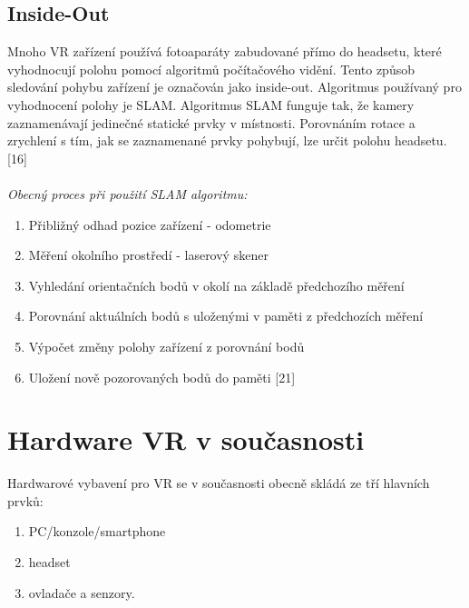 \documentclass[a4paper, 12pt]{report}
\begin{document}
\subsection{Inside-Out}
Mnoho VR zařízení používá fotoaparáty zabudované přímo do headsetu, které vyhodnocují polohu pomocí algoritmů počítačového vidění. Tento způsob sledování pohybu zařízení je označován jako inside-out. Algoritmus používaný pro vyhodnocení polohy je SLAM. Algoritmus SLAM funguje tak, že kamery zaznamenávají jedinečné statické prvky v místnosti. Porovnáním rotace a zrychlení s tím, jak se zaznamenané prvky pohybují, lze určit polohu headsetu.[16]\\
\\
\textit{Obecný proces při použití SLAM algoritmu:}
\begin{enumerate}
\item Přibližný odhad pozice zařízení - odometrie
\item Měření okolního prostředí - laserový skener
\item Vyhledání orientačních bodů v okolí na základě předchozího měření
\item Porovnání aktuálních bodů s uloženými v paměti z předchozích měření
\item Výpočet změny polohy zařízení z porovnání bodů 
\item Uložení nově pozorovaných bodů do paměti [21]
\end{enumerate}


\section{Hardware VR v současnosti}
Hardwarové vybavení pro VR se v současnosti obecně skládá ze tří hlavních prvků: 
\begin{enumerate}
\item PC/konzole/smartphone
\item headset
\item ovladače a senzory.
\end{enumerate}
\end{document}
